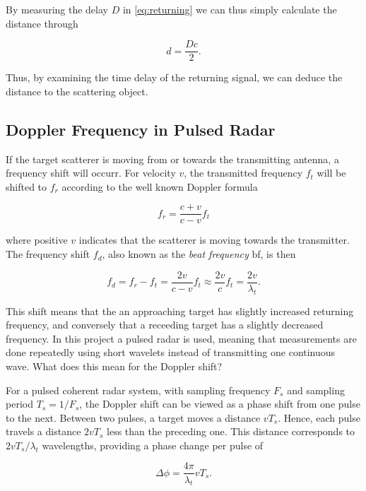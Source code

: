 By measuring the delay $D$ in \ref{eq:returning} we can thus simply calculate the distance through

\begin{equation}
	d = \frac{Dc}{2}.
\end{equation}

Thus, by examining the time delay of the returning signal, we can deduce the distance to the scattering object. 

\subsection{Doppler Frequency in Pulsed Radar}\label{sec:doppler}
\label{doppler}

If the target scatterer is moving from or towards the transmitting antenna, a frequency shift will occurr. For velocity $v$, the transmitted frequency $f_t$ will be shifted to $f_r$ according to the well known Doppler formula \citep{ridenour_1947}

\begin{equation}
	f_r = \frac{c + v}{c - v}f_t
\end{equation}

where positive $v$ indicates that the scatterer is moving towards the transmitter. The frequency shift $f_d$, also known as the \emph{beat frequency} \gls{bf}, is then

\begin{equation}\label{eq:dshift}
	f_d 
	= f_r - f_t 
	= \frac{2v}{c-v}f_t \approx \frac{2v}{c}f_t 
	= \frac{2v}{\lambda_t}.
\end{equation}

This shift means that the an approaching target has slightly increased returning frequency, and conversely that a receeding target has a slightly decreased frequency. In this project a pulsed radar is used, meaning that measurements are done repeatedly using short wavelets instead of transmitting one continuous wave. What does this mean for the Doppler shift?

For a pulsed coherent radar system, with sampling frequency $F_s$ and sampling period $T_s = 1/F_s$, the Doppler shift can be viewed as a phase shift from one pulse to the next. Between two pulses, a target moves a distance $vT_s$. Hence, each pulse travels a distance $2vT_s$ less than the preceding one. This distance corresponds to $2vT_s/\lambda_t$ wavelengths, providing a phase change per pulse of

\begin{equation}
	\Delta \phi = \frac{4\pi}{\lambda_t}vT_s.
\end{equation}


